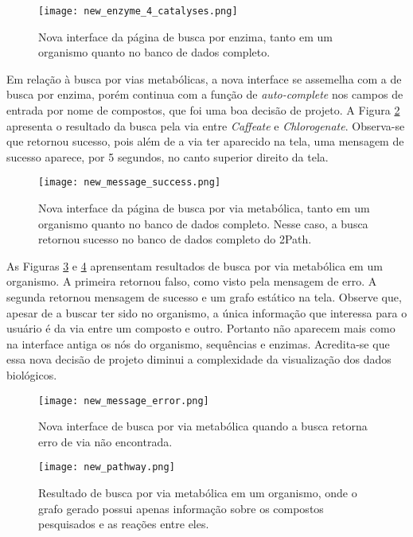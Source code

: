 \begin{figure}[!h]
	\centering
	\texttt{[image: new\_enzyme\_4\_catalyses.png]}
	\caption{Nova interface da página de busca por enzima, tanto em um organismo quanto no banco de dados completo.}
	\label{fig:new_enzyme_4_catalyses}
\end{figure}

\indent Em relação à busca por vias metabólicas, a nova interface se assemelha com a de busca por enzima, porém continua com a função de \textit{auto-complete} nos campos de entrada por nome de compostos, que foi uma boa decisão de projeto. A Figura \ref{fig:new_message_success} apresenta o resultado da busca pela via entre \textit{Caffeate} e \textit{Chlorogenate}. Observa-se que retornou sucesso, pois além de a via ter aparecido na tela, uma mensagem de sucesso aparece, por 5 segundos, no canto superior direito da tela.

\begin{figure}[!h]
    \centering
    \texttt{[image: new\_message\_success.png]}
    \caption{Nova interface da página de busca por via metabólica, tanto em um organismo quanto no banco de dados completo. Nesse caso, a busca retornou sucesso no banco de dados completo do 2Path.}
    \label{fig:new_message_success}
\end{figure}

\indent As Figuras \ref{fig:new_message_error} e \ref{fig:new_pathway} aprensentam resultados de busca por via metabólica em um organismo. A primeira retornou falso, como visto pela mensagem de erro. A segunda retornou mensagem de sucesso e um grafo estático na tela. Observe que, apesar de a buscar ter sido no organismo, a única informação que interessa para o usuário é da via entre um composto e outro. Portanto não aparecem mais como na interface antiga os nós do organismo, sequências e enzimas. Acredita-se que essa nova decisão de projeto diminui a complexidade da visualização dos dados biológicos.

\begin{figure}[!h]
    \centering
    \texttt{[image: new\_message\_error.png]}
    \caption{Nova interface de busca por via metabólica quando a busca retorna erro de via não encontrada.}
    \label{fig:new_message_error}
\end{figure}

\newpage
\begin{figure}[!t]
    \centering
    \texttt{[image: new\_pathway.png]}
    \caption{Resultado de busca por via metabólica em um organismo, onde o grafo gerado possui apenas informação sobre os compostos pesquisados e as reações entre eles.}
    \label{fig:new_pathway}
\end{figure}




